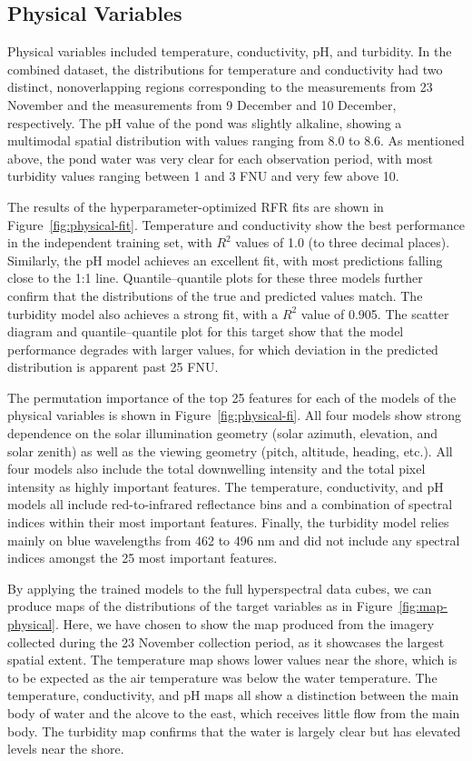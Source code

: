 \clearpage
\newpage

\subsection{Physical Variables}

Physical variables included temperature, conductivity, pH, and turbidity. In the combined dataset, the distributions for temperature and conductivity had two distinct, nonoverlapping regions corresponding to the measurements from 23 November and the measurements from 9 December and 10 December, respectively. The pH value of the pond was slightly alkaline, showing a multimodal spatial distribution with values ranging from 8.0 to 8.6. As mentioned above, the pond water was very clear for each observation period, with most turbidity values ranging between 1 and 3 FNU and very few above 10.

The results of the hyperparameter-optimized RFR fits are shown in Figure~\ref{fig:physical-fit}. Temperature and conductivity show the best performance in the independent training set, with $R^2$ values of 1.0 (to three decimal places). Similarly, the pH model achieves an excellent fit, with most predictions falling close to the 1:1 line. Quantile--quantile plots for these three models further confirm that the distributions of the true and predicted values match. The turbidity model also achieves a strong fit, with a $R^2$ value of 0.905. The scatter diagram and quantile--quantile plot for this target show that the model performance degrades with larger values, for which deviation in the predicted distribution is apparent past 25 FNU.

The permutation importance of the top 25 features for each of the models of the physical variables is shown in Figure~\ref{fig:physical-fi}. All four models show strong dependence on the solar illumination geometry (solar azimuth, elevation, and solar zenith) as well as the viewing geometry (pitch, altitude, heading, etc.). All four models also include the total downwelling intensity and the total pixel intensity as highly important features. The temperature, conductivity, and pH models all include red-to-infrared reflectance bins and a combination of spectral indices within their most important features. Finally, the turbidity model relies mainly on blue wavelengths from 462 to 496 nm and did not include any spectral indices amongst the 25 most important features.

By applying the trained models to the full hyperspectral data cubes, we can produce maps of the distributions of the target variables as in Figure~\ref{fig:map-physical}. Here, we have chosen to show the map produced from the imagery collected during the 23 November collection period, as it showcases the largest spatial extent. The temperature map shows lower values near the shore, which is to be expected as the air temperature was below the water temperature. The temperature, conductivity, and pH maps all show a distinction between the main body of water and the alcove to the east, which receives little flow from the main body. The turbidity map confirms that the water is largely clear but has elevated levels near the shore.

